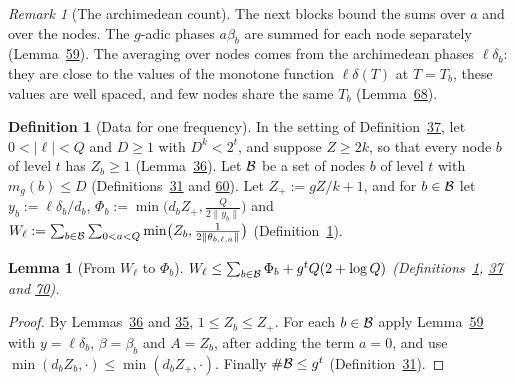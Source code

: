 \documentclass[11pt]{article}
\newcounter{hffc}
\theoremstyle{definition}\newtheorem{hffdef}[hffc]{Definition}
\theoremstyle{plain}\newtheorem{hfflem}[hffc]{Lemma}\newtheorem{hffthm}[hffc]{Theorem}
\theoremstyle{remark}\newtheorem{hffrem}[hffc]{Remark}
\newcommand{\hffcost}{}
\newcommand{\setcost}[1]{\renewcommand{\hffcost}{#1}}
\begin{document}
\begin{hffrem}[The archimedean count]\label{R:arch}
The next blocks bound the sums over $a$ and over the nodes. The $g$-adic phases $a\beta_b$ are summed for each node separately (Lemma~\hyperref[L:asum]{59}). The averaging over nodes comes from the archimedean phases $\ell\delta_b$: they are close to the values of the monotone function $\ell\delta(T)$ at $T=T_b$, these values are well spaced, and few nodes share the same $T_b$ (Lemma~\hyperref[L:fibre]{68}).
\end{hffrem}

\begin{hffdef}[Data for one frequency]\label{D:count}
In the setting of Definition~\hyperref[D:phase]{37}, let $0<|\ell|<Q$ and $D\ge1$ with $D^k<2^t$, and suppose $Z\ge2k$, so that every node $b$ of level $t$ has $Z_b\ge1$ (Lemma~\hyperref[L:nonempty]{36}). Let $\mathcal{B}$ be a set of nodes $b$ of level $t$ with $m_g(b)\le D$ (Definitions~\hyperref[D:node]{31} and \hyperref[D:gpart]{60}). Let $Z_+:=gZ/k+1$, and for $b\in\mathcal{B}$ let $y_b:=\ell\delta_b/d_b$, $\Phi_b:=\min\bigl(d_bZ_+,\frac Q{2\|y_b\|}\bigr)$ and $W_\ell:=\sum_{b\in\mathcal{B}}\sum_{0<a<Q}\min\bigl(Z_b,\frac1{2\|\theta_{b,\ell,a}\|}\bigr)$ (Definition~\hyperref[D:conv]{1}).
\par\nopagebreak{}
\end{hffdef}

\begin{hfflem}[From $W_\ell$ to $\Phi_b$]\label{L:wphi}
$W_\ell\le\sum_{b\in\mathcal{B}}\Phi_b+g^tQ(2+\log Q)$ (Definitions~\hyperref[D:conv]{1}, \hyperref[D:phase]{37} and \hyperref[D:count]{70}).
\par\nopagebreak{}
\end{hfflem}
\begin{proof}\setcost{length 147/300}By Lemmas~\hyperref[L:nonempty]{36} and \hyperref[L:sizes]{35}, $1\le Z_b\le Z_+$. For each $b\in\mathcal{B}$ apply Lemma~\hyperref[L:asum]{59} with $y=\ell\delta_b$, $\beta=\beta_b$ and $A=Z_b$, after adding the term $a=0$, and use $\min(d_bZ_b,\cdot)\le\min(d_bZ_+,\cdot)$. Finally $\#\mathcal{B}\le g^t$ (Definition~\hyperref[D:node]{31}).
\end{proof}
\end{document}
